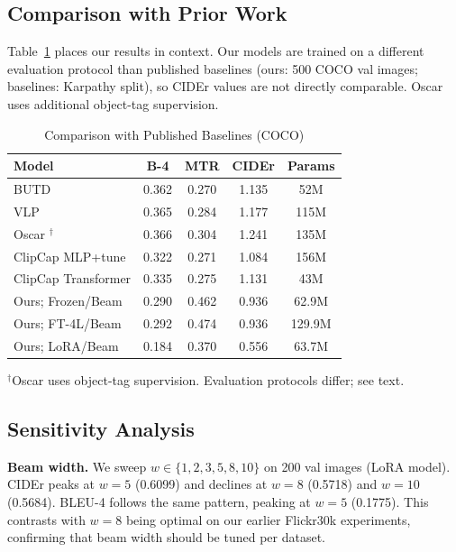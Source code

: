 \documentclass[conference]{IEEEtran}
\begin{document}
\subsection{Comparison with Prior Work}

Table~\ref{tab:comparison} places our results in context. Our models are trained on a different evaluation protocol than published baselines (ours: 500 COCO val images; baselines: Karpathy split), so CIDEr values are not directly comparable. Oscar uses additional object-tag supervision.

\begin{table}[t]
\caption{Comparison with Published Baselines (COCO)}
\label{tab:comparison}
\centering
\setlength{\tabcolsep}{4pt}
\begin{tabular}{lcccc}
\toprule
\textbf{Model} & \textbf{B-4} & \textbf{MTR} & \textbf{CIDEr} & \textbf{Params} \\
\midrule
BUTD \cite{anderson2018bottom}           & 0.362 & 0.270 & 1.135 & 52M \\
VLP \cite{zhou2020unified}               & 0.365 & 0.284 & 1.177 & 115M \\
Oscar \cite{li2020oscar}$^\dagger$       & 0.366 & 0.304 & 1.241 & 135M \\
ClipCap MLP+tune \cite{mokady2021clipcap}& 0.322 & 0.271 & 1.084 & 156M \\
ClipCap Transformer \cite{mokady2021clipcap}& 0.335 & 0.275 & 1.131 & 43M \\
\midrule
Ours; Frozen/Beam  & 0.290 & 0.462 & 0.936 & 62.9M \\
Ours; FT-4L/Beam   & 0.292 & 0.474 & 0.936 & 129.9M \\
Ours; LoRA/Beam    & 0.184 & 0.370 & 0.556 & 63.7M \\
\bottomrule
\end{tabular}
\vspace{2pt}
{\small $^\dagger$Oscar uses object-tag supervision. Evaluation protocols differ; see text.}
\end{table}

\subsection{Sensitivity Analysis}

\textbf{Beam width.} We sweep $w \in \{1,2,3,5,8,10\}$ on 200 val images (LoRA model). CIDEr peaks at $w=5$ (0.6099) and declines at $w=8$ (0.5718) and $w=10$ (0.5684). BLEU-4 follows the same pattern, peaking at $w=5$ (0.1775). This contrasts with $w=8$ being optimal on our earlier Flickr30k experiments, confirming that beam width should be tuned per dataset.
\end{document}
